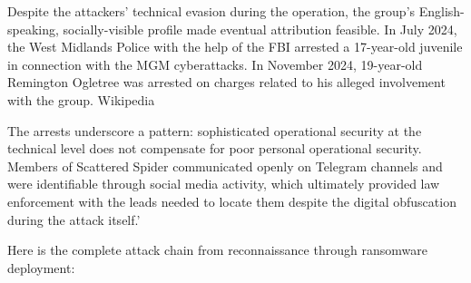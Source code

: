 Despite the attackers' technical evasion during the operation, the group's English-speaking, socially-visible profile made eventual attribution feasible. In July 2024, the West Midlands Police with the help of the FBI arrested a 17-year-old juvenile in connection with the MGM cyberattacks. In November 2024, 19-year-old Remington Ogletree was arrested on charges related to his alleged involvement with the group. Wikipedia

The arrests underscore a pattern: sophisticated operational security at the technical level does not compensate for poor personal operational security. Members of Scattered Spider communicated openly on Telegram channels and were identifiable through social media activity, which ultimately provided law enforcement with the leads needed to locate them despite the digital obfuscation during the attack itself.'


Here is the complete attack chain from reconnaissance through ransomware deployment:

